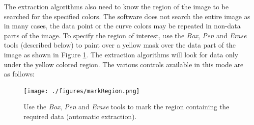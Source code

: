 \documentclass[letterpaper, 10pt]{article}
\begin{document}
The extraction algorithms also need to know the region of the image to be searched for the specified colors. The software does not search the entire image as in many cases, the data point or the curve colors may be repeated in non-data parts of the image. To specify the region of interest, use the \emph{Box}, \emph{Pen} and \emph{Erase} tools (described below) to paint over a yellow mask over the data part of the image as shown in Figure \ref{fig:markRegion}. The extraction algorithms will look for data only under  the yellow colored region. The various controls available in this mode are as follows:
\begin{figure}
\begin{center}
\texttt{[image: ./figures/markRegion.png]}
\caption{Use the \emph{Box}, \emph{Pen} and \emph{Erase} tools to mark the region containing the required data (automatic extraction).}
\label{fig:markRegion}
\end{center}
\end{figure}
\end{document}
